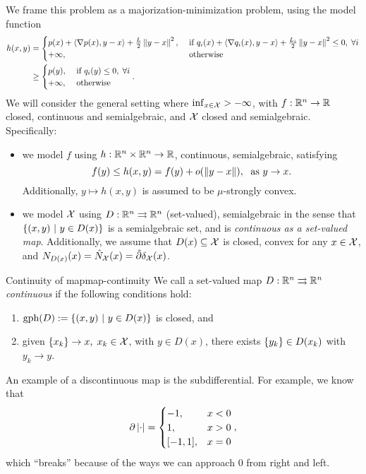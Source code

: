 We frame this problem as a majorization-minimization problem, using the model
function
\begin{align*}
	h(x, y) &= \begin{cases}
		p(x) + \left\langle \nabla p(x), y - x \right\rangle + \frac{L}{2} \left \| y - x \right \|^2, & \text{ if
		} q_i(x) + \left\langle \nabla q_i(x), y - x \right\rangle + \frac{L_i}{2} \left \| y - x \right \|^2
		\leq 0, \; \forall i \\
		+\infty, & \text{ otherwise}
	\end{cases} \\
		& \geq \begin{cases}
		p(y), & \text{ if } q_i(y) \leq 0, \; \forall i \\
		+\infty, & \text{ otherwise}
	\end{cases}.
\end{align*}
We will consider the general setting where $ \inf_{x \in \mathcal{X}} > -\infty$, with
$f: \mathbb{R}^n \to \mathbb{R}$ closed, continuous and semialgebraic, and $\mathcal{X}$ closed and
semialgebraic. Specifically:
\begin{itemize}
	\item we model $f$ using $h: \mathbb{R}^{n} \times \mathbb{R}^n \to \mathbb{R}$,
	continuous, semialgebraic, satisfying
	\[
		f(y) \leq h(x, y) = f(y) + o(\left \| y - x \right \|), \; \text{ as } y \to x.
	\]
	Additionally, $y \mapsto h(x, y)$ is assumed to be $\mu$-strongly convex.
	\item we model $\mathcal{X}$ using $D: \mathbb{R}^n \rightrightarrows \mathbb{R}^n$ (set-valued),
		semialgebraic in the sense that $\left\{ (x, y) \ \middle| \  y \in D(x) \right\}$ is a
		semialgebraic set, and is \textit{continuous as a set-valued map}.
		Additionally, we assume that $D(x) \subseteq \mathcal{X}$ is closed, convex for
		any $x \in \mathcal{X}$, and $N_{D(x)}(x) = \hat{N}_{\mathcal{X}}(x) = \hat{\partial}
		\delta_{\mathcal{X}}(x)$.
\end{itemize}

\begin{cdefinition}{Continuity of map}{map-continuity}
	We call a set-valued map $D: \mathbb{R}^n \rightrightarrows \mathbb{R}^n$ \textit{continuous} if
	the following conditions hold:
	\begin{enumerate}
		\item $\mathrm{gph}(D) := \left\{ (x, y) \ \middle| \  y \in D(x) \right\}$ is closed, and
		\item given $\left\{ x_k \right\} \to x, \; x_k \in \mathcal{X}$, with $y \in D(x)$, there
			exists $\left\{ y_k \right\} \in D(x_k)$ with $y_k \to y$.
	\end{enumerate}
\end{cdefinition}

An example of a discontinuous map is the subdifferential. For example, we know
that
\[
	\partial \left| \cdot \right| = \begin{cases}
		-1, & x < 0 \\
		1, & x > 0 \\
		[-1, 1], & x = 0
	\end{cases},
\]
which ``breaks'' because of the ways we can approach $0$ from right and left.


